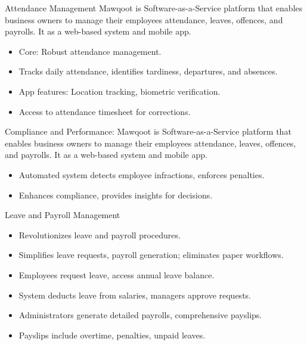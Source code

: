 \documentclass{loyola-beamer}
\begin{document}
\begin{frame}{Attendance Management}
Mawqoot is Software-as-a-Service platform that enables business owners 
  to manage their employees attendance, leaves, offences, and payrolls.
  It as a web-based system and mobile app.
	\vspace{\baselineskip}

    \begin{itemize}
        \item Core: Robust attendance management.
        \item Tracks daily attendance, identifies tardiness, departures, and absences.
        \item App features: Location tracking, biometric verification.
        \item Access to attendance timesheet for corrections.
    \end{itemize}
\end{frame}

\begin{frame}{Compliance and Performance:}
Mawqoot is Software-as-a-Service platform that enables business owners 
  to manage their employees attendance, leaves, offences, and payrolls.
  It as a web-based system and mobile app.
	\vspace{\baselineskip}

    \begin{itemize}
        \item Automated system detects employee infractions, enforces penalties.
        \item Enhances compliance, provides insights for decisions.
    \end{itemize}
\end{frame}

\begin{frame}{Leave and Payroll Management}
    \begin{itemize}
        \item Revolutionizes leave and payroll procedures.
        \item Simplifies leave requests, payroll generation; eliminates paper workflows.
        \item Employees request leave, access annual leave balance.
        \item System deducts leave from salaries, managers approve requests.
        \item Administrators generate detailed payrolls, comprehensive payslips.
        \item Payslips include overtime, penalties, unpaid leaves.
    \end{itemize}
\end{frame}
\end{document}

